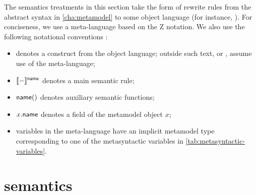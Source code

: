 The semantics treatments in this section take the form of rewrite rules from
the abstract syntax in \cref{cha:metamodel} to some object language (for
instance, \tockcsp).
For conciseness, we use a meta-language based on the Z notation.
We also use the following notational conventions :

\begin{itemize}
\item
	 denotes a construct from the object
	language; outside such text, or ,
	assume use of the meta-language;
\item
	\(\llbracket - \rrbracket^{\mathsf{name}}\) denotes a main semantic rule;
\item
	\(\mathsf{name}()\) denotes auxiliary semantic functions;
\item
	\(x.\mathsf{name}\) denotes a field of the metamodel object \(x\);
\item
	variables in the meta-language have an implicit metamodel type
	corresponding to one of the metasyntactic variables in
	\cref{tab:metasyntactic-variables}.
\end{itemize}

\section{\tockcsp{} semantics}\label{sec:semantics-tockcsp}

